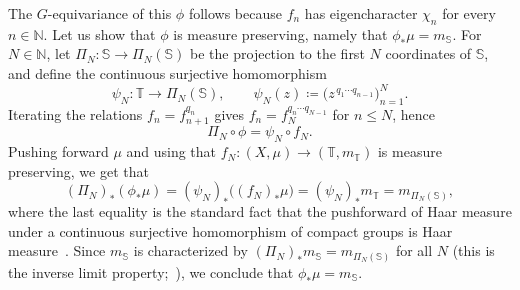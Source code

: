 \documentclass{amsart}
\numberwithin{equation}{subsection}
\theoremstyle{remark}
\begin{document}
\smallskip

The \(G\)-equivariance of this \(\phi\) follows because \(f_{n}\) has eigencharacter \(\chi_{n}\) for every \(n\in\mathbb{N}\). Let us show that \(\phi\) is measure preserving, namely that \(\phi_{\ast}\mu=m_{\mathbb{S}}\).
For \(N\in\mathbb{N}\), let \(\Pi_{N}:\mathbb{S}\to\Pi_{N}(\mathbb{S})\) be the projection to the first \(N\) coordinates of \(\mathbb{S}\), and define the continuous surjective homomorphism
\[\psi_{N}:\mathbb{T}\longrightarrow \Pi_{N}(\mathbb{S}),\qquad\psi_{N}(z)\coloneqq\big(z^{\,q_{1}\cdots q_{n-1}}\big)_{n=1}^{N}.\]
Iterating the relations \(f_{n}=f_{n+1}^{q_{n}}\) gives \(f_{n}=f_{N}^{q_{n}\cdots q_{N-1}}\) for \(n\le N\), hence
\[\Pi_{N}\circ\phi=\psi_{N}\circ f_{N}.\]
Pushing forward \(\mu\) and using that \(f_{N}:(X,\mu)\to(\mathbb{T},m_{\mathbb{T}})\) is measure preserving, we get that
\[\left(\Pi_{N}\right)_{\ast}\left(\phi_{\ast}\mu\right)=\left(\psi_{N}\right)_{\ast}\big(\left(f_{N}\right)_{\ast}\mu\big)
=\left(\psi_{N}\right)_{\ast}m_{\mathbb{T}}
= m_{\Pi_{N}\left(\mathbb{S}\right)},
\]
where the last equality is the standard fact that the pushforward of Haar measure under a continuous surjective homomorphism of compact groups is Haar measure~\cite[Ex.~(15.17)(j)]{HewittRoss}. Since \(m_{\mathbb{S}}\) is characterized by \(\left(\Pi_{N}\right)_{\ast}m_{\mathbb{S}}=m_{\Pi_{N}\left(\mathbb{S}\right)}\) for all \(N\) (this is the inverse limit property;~\cite[Ex.~(15.17)(k)]{HewittRoss}), we conclude that \(\phi_{\ast}\mu=m_{\mathbb{S}}\).
\end{document}
